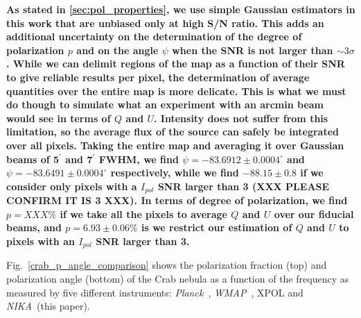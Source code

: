 \documentclass[twocolumn,traditabstract]{aa}
\def\NIKA{\textit{NIKA}}
\def\Planck{\textit{Planck}}
\def\WMAP{\textit{WMAP}}
\begin{document}
{\bf As stated in \ref{sec:pol_properties}, we use simple Gaussian estimators in
  this work that are unbiased only at high S/N ratio. This adds an additional
  uncertainty on the determination of the degree of polarization $p$ and on the
  angle $\psi$ when the SNR is not larger than $\sim 3\sigma$. While we can
  delimit regions of the map as a function of their SNR to give reliable results
  per pixel, the determination of average quantities over the entire map is more
  delicate. This is what we must do though to simulate what an experiment with
  an arcmin beam would see in terms of $Q$ and $U$. Intensity does not suffer
  from this limitation, so the average flux of the source can safely be
  integrated over all pixels. Taking the entire map and
  averaging it over Gaussian beams of 5$^{\prime}$ and 7$^{\prime}$ FWHM, we
  find $\psi = -83.6912 \pm 0.0004^{\circ}$ and $\psi = -83.6491 \pm 0.0004^{\circ}$
  respectively, while we find $-88.15 \pm 0.8$ if we consider only pixels with a
  $I_{pol}$ SNR larger than 3 (XXX PLEASE CONFIRM IT IS 3 XXX). In terms of
  degree of polarization, we find $p = XXX\%$ if we take all the pixels to average $Q$ and $U$ over our
  fiducial beams, and $p = 6.93 \pm 0.06\%$ is we restrict our estimation of $Q$
  and $U$ to pixels with an $I_{pol}$ SNR larger than 3.}


Fig.~\ref{crab_p_angle_comparison} shows the polarization fraction (top) and polarization angle (bottom) of the Crab nebula as a function of the frequency as measured by
five different instruments: \Planck\ \citep{2015arXiv150702058P},
\WMAP\ \citep{2011ApJS..192...19W}, XPOL \citep{aumont2010} and \NIKA\ (this paper).  
\end{document}
